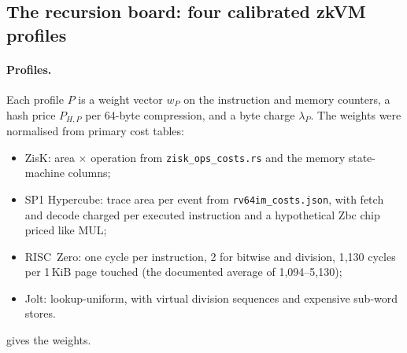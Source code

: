 \subsection{The recursion board: four calibrated zkVM profiles}\label{subsec:cost-zk}

\paragraph{Profiles.} Each profile $P$ is a weight vector $w_P$ on the instruction and memory
counters, a hash price $P_{H,P}$ per 64-byte compression, and a byte charge $\lambda_P$. The weights were
normalised from primary cost tables:
\begin{itemize}[nosep]
\item ZisK: area $\times$ operation from \texttt{zisk\_ops\_costs.rs} and the memory state-machine
  columns;
\item SP1 Hypercube: trace area per event from \texttt{rv64im\_costs.json}, with fetch and decode charged
  per executed instruction and a hypothetical Zbc chip priced like MUL;
\item RISC~Zero: one cycle per instruction, 2 for bitwise and division, 1{,}130 cycles per 1\,KiB page
  touched (the documented average of 1{,}094--5{,}130);
\item Jolt: lookup-uniform, with virtual division sequences and expensive sub-word stores.
\end{itemize}
 gives the weights.

